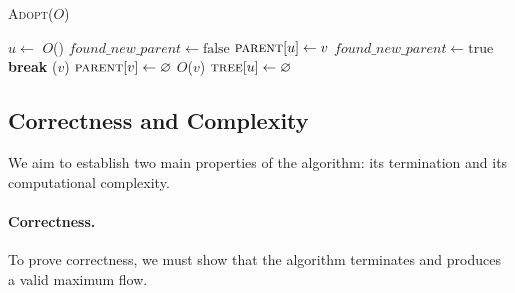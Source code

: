 \begin{algorithm}[H]
\caption{\textsc{Adopt}($O$)}
\begin{algorithmic}[1]
    \State $u \gets$ $O$()
    \State $found\_new\_parent \gets \text{false}$
            \State $\textsc{parent}[u] \gets v$
            \State $found\_new\_parent \gets \text{true}$
            \State \textbf{break}
        \EndIf
    \EndFor
                    \State {}($v$)
                \EndIf
                    \State $\textsc{parent}[v] \gets \varnothing$
                    \State $O$($v$)
                \EndIf
            \EndIf
        \EndFor
        \State $\textsc{tree}[u] \gets \varnothing$
    \EndIf
\EndWhile
\end{algorithmic}
\end{algorithm}

\subsection{Correctness and Complexity}

We aim to establish two main properties of the algorithm: its termination and its computational complexity.

\paragraph*{Correctness.}  
To prove correctness, we must show that the algorithm terminates and produces a valid maximum flow.

